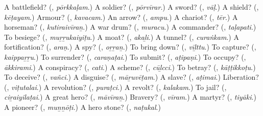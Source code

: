 \begin{tcolorbox}[breakable,colback=teal!4,colframe=teal!35!black,title={Before you move on}]
A battlefield? (\textbf{}, \emph{pōrkkaḷam}.) A soldier? (\textbf{}, \emph{pōrvīrar}.) A sword? (\textbf{}, \emph{vāḷ}.) A shield? (\textbf{}, \emph{kēṭayam}.) Armour? (\textbf{}, \emph{kavacam}.) An arrow? (\textbf{}, \emph{ampu}.) A chariot? (\textbf{}, \emph{tēr}.) A horseman? (\textbf{}, \emph{kutiraivīraṉ}.) A war drum? (\textbf{}, \emph{muracu}.) A commander? (\textbf{}, \emph{taḷapati}.) To besiege? (\textbf{}, \emph{muṟṟukaiyiṭu}.) A moat? (\textbf{}, \emph{akaḻi}.) A tunnel? (\textbf{}, \emph{curaṅkam}.) A fortification? (\textbf{}, \emph{araṇ}.) A spy? (\textbf{}, \emph{oṟṟaṉ}.) To bring down? (\textbf{}, \emph{vīḻttu}.) To capture? (\textbf{}, \emph{kaippaṟṟu}.) To surrender? (\textbf{}, \emph{caraṇaṭai}.) To submit? (\textbf{}, \emph{aṭipaṇi}.) To occupy? (\textbf{}, \emph{ākkirami}.) A conspiracy? (\textbf{}, \emph{cati}.) A scheme? (\textbf{}, \emph{cūḻcci}.) To betray? (\textbf{}, \emph{kāṭṭikkoṭu}.) To deceive? (\textbf{}, \emph{vañci}.) A disguise? (\textbf{}, \emph{māṟuvēṭam}.) A slave? (\textbf{}, \emph{aṭimai}.) Liberation? (\textbf{}, \emph{viṭutalai}.) A revolution? (\textbf{}, \emph{puraṭci}.) A revolt? (\textbf{}, \emph{kalakam}.) To jail? (\textbf{}, \emph{ciṟaiyilaṭai}.) A great hero? (\textbf{}, \emph{māvīraṉ}.) Bravery? (\textbf{}, \emph{vīram}.) A martyr? (\textbf{}, \emph{tiyāki}.) A pioneer? (\textbf{}, \emph{muṉṉōṭi}.) A hero stone? (\textbf{}, \emph{naṭukal}.)
\end{tcolorbox}
